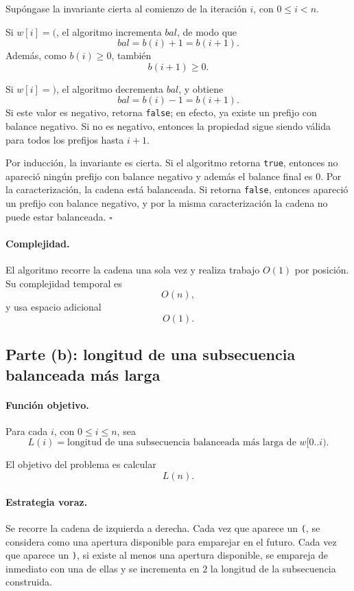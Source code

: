 \documentclass[11pt]{article}
\begin{document}
Supóngase la invariante cierta al comienzo de la iteración \(i\), con \(0\leq i<n\).

Si \(w[i]=\texttt{(}\), el algoritmo incrementa \(bal\), de modo que
\[
bal=b(i)+1=b(i+1).
\]
Además, como \(b(i)\geq 0\), también
\[
b(i+1)\geq 0.
\]

Si \(w[i]=\texttt{)}\), el algoritmo decrementa \(bal\), y obtiene
\[
bal=b(i)-1=b(i+1).
\]
Si este valor es negativo, retorna \texttt{false}; en efecto, ya existe un prefijo con balance
negativo. Si no es negativo, entonces la propiedad sigue siendo válida para todos los
prefijos hasta \(i+1\).

Por inducción, la invariante es cierta. Si el algoritmo retorna \texttt{true}, entonces
no apareció ningún prefijo con balance negativo y además el balance final es \(0\).
Por la caracterización, la cadena está balanceada. Si retorna \texttt{false}, entonces
apareció un prefijo con balance negativo, y por la misma caracterización la cadena no
puede estar balanceada. \(\square\)

\paragraph{Complejidad.}
El algoritmo recorre la cadena una sola vez y realiza trabajo \(O(1)\) por posición. Su
complejidad temporal es
\[
O(n),
\]
y usa espacio adicional
\[
O(1).
\]

\subsection*{Parte (b): longitud de una subsecuencia balanceada más larga}

\paragraph{Función objetivo.}
Para cada \(i\), con \(0\leq i\leq n\), sea
\[
L(i)=\text{longitud de una subsecuencia balanceada más larga de } w[0..i).
\]

El objetivo del problema es calcular
\[
L(n).
\]

\paragraph{Estrategia voraz.}
Se recorre la cadena de izquierda a derecha. Cada vez que aparece un \texttt{(}, se
considera como una apertura disponible para emparejar en el futuro. Cada vez que
aparece un \texttt{)}, si existe al menos una apertura disponible, se empareja de inmediato
con una de ellas y se incrementa en \(2\) la longitud de la subsecuencia construida.
\end{document}
